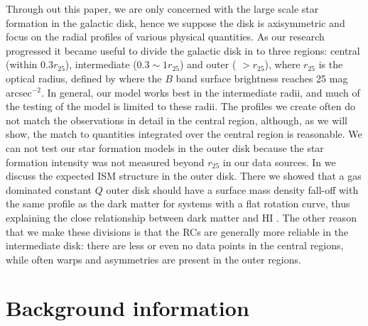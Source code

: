 \documentclass[12pt,preprint]{aastex}
\begin{document}
Through out this paper, we are only concerned with the large scale star formation in the galactic disk, hence we suppose the disk is axisymmetric and focus on the radial profiles of various physical quantities.  
As our research progressed it became useful to divide the galactic disk in to three regions: 
central (within $0.3 r_{25}$),
intermediate ($0.3\sim1 r_{25}$) and outer (  $> r_{25}$), where
$r_{25}$ is the optical radius, defined by where the $B$ band surface
brightness reaches 25 mag arcsec$^{-2}$. 
In general, our model works best in the intermediate radii, and much of the testing of the model is limited to these radii.  The profiles we create often do not match the observations in detail in the central region, although, as we will show, the match to quantities integrated over the central region is reasonable.  
We can not test our star formation models in the outer disk because the star formation intensity was not measured beyond $r_{25}$ in our data sources.  
In \citet{meu13} we discuss the expected ISM structure in the outer disk. There we showed  that a gas dominated constant $Q$ outer disk should have a surface mass  density fall-off with the same profile as the dark matter for systems with a flat rotation curve, thus explaining the close relationship between dark matter and HI \citep{bos81, hoe01, hes11}.
The other reason that we make these divisions is that the RCs are generally more reliable in the intermediate disk: there are less or even no data points in the central regions, while often warps and asymmetries are present  in the outer regions.  




\section{Background information}
\label{bkintro}
\end{document}
